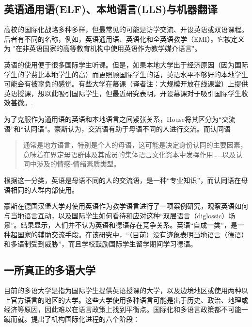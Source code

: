 \documentclass[output=paper]{langscibook}
\begin{document}
\subsection{英语通用语(ELF)、本地语言(LLS)与机器翻译}
‌高校的国际化战略多种多样，但最常见的可能是访学交流、开设英语或双语课程。后者有不同的名称，例如，英语通用语、英语化和全英语教学（EMI）。它被定义为 "在非英语国家的高等教育机构中使用英语作为教学媒介语言"\citep{MultilingualHigherEducation2016}。

‌英语的使用便于很多国际学生听课。但是，如果本地大学出于经济原因（因为国际学生的学费比本地学生的高）而更照顾国际学生的话，英语水平不够好的本地学生可能会有被辜负的感觉。‌有些大学在慕课（译者注：大规模开放在线课堂）上提供英语授课，想以此吸引国际学生，但最近研究表明，开设慕课对于吸引国际学生收效甚微。\citep{Zakharova2019}.

‌为了克服作为通用语的英语和本地语言之间紧张关系，House\citet{House2003}将其区分为“交流语”和“认同语”。豪斯\citet[560]{House2003}认为，交流语有助于母语不同的人进行交流。而认同语

\begin{quote}
 {通常是地方语言，特别是个人的母语，这可能是决定身份认同的主要因素，意味着在界定母语群体及其成员的集体语言文化资本中发挥作用……以及认同中涉及的情感-情绪素质类型。\citep[561]{House2003}}
\end{quote}

\begin{sloppypar}
根据这一分类，英语是母语不同的人的交流语，是一种“专业知识”\citep[561]{House2003}，而认同语在母语相同的人群内部使用。
\end{sloppypar}

豪斯\citet{House2003}在德国汉堡大学对使用英语作为教学语言进行了一项案例研究，观察英语如何与当地语言互动，以及国际学生如何看待和应对这种“双层语言（diglossic）场景”\citep[570]{House2003}。结果显示，人们并不认为英语和德语存在竞争关系。英语“自成一类”，是一种超国家的辅助交流手段。在该研究中，“（目前）没有迹象表明当地语言（德语）和多语制受到威胁”\citep[574]{House2003}，而且学校鼓励国际学生留学期间学习德语。

\subsection{一所真正的多语大学}
目前的多语大学是指为国际学生提供英语授课的大学，以及边境地区或使用两种以上官方语言的地区的大学。这些大学使用多种语言可能是出于历史、政治、地理或经济等原因，因此难以在语言政策上找到平衡点。国际化和多语言政策都不可能一蹴而就。\citet[12]{Knight1994}提出了机构国际化进程的六个阶段：
\end{document}

